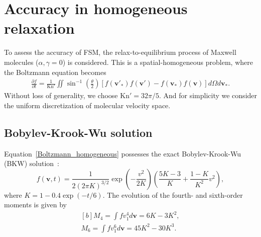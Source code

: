 \section{Accuracy in homogeneous relaxation}

To assess the accuracy of FSM, the relax-to-equilibrium process of Maxwell molecules ($\alpha,\gamma=0$) is considered. This is a spatial-homogeneous problem, where the Boltzmann equation becomes 
\begin{eqnarray}
 \frac{\partial {f}}{\partial{t}}=\frac{1}{\text{Kn}'}\iint
\sin^{-1}\left(\frac{\theta}{2}\right)
[{f}({\bm{v}}'_{\ast}){f}({\bm{v}}')-{f}({\bm{v}}_\ast)
  {f}({\bm{v}})]d\Omega d{\bm{v}}_\ast. 
  \label{Boltzmann_homogeneous}
\end{eqnarray}
Without loss of generality, we choose $\text{Kn}'=32\pi/5$. And for simplicity we consider the uniform discretization of molecular velocity space.

\subsection{Bobylev-Krook-Wu solution}

Equation~\eqref{Boltzmann_homogeneous} possesses the exact Bobylev-Krook-Wu (BKW) solution~\cite{BKW}:
\begin{equation}\label{initial_2}
    f(\bm{v},t)=\frac{1}{2(2\pi{K})^{3/2}}\exp\left(-\frac{{v^2}}{2K}\right)\left(\frac{5K-3}{K}+\frac{1-K}{K^2}{v^2}\right),
\end{equation}
where  $K=1-0.4\exp\left(-{t}/{6}\right)$. The evolution of the fourth- and sixth-order moments is given by
\begin{equation}\label{initial_22}
\begin{aligned}[b]
	M_4=\int fv_1^4d\bm{v}=6K-3K^2,\\ 
	M_6=\int fv_1^6d\bm{v}=45K^2-30K^3.
\end{aligned}
\end{equation}


